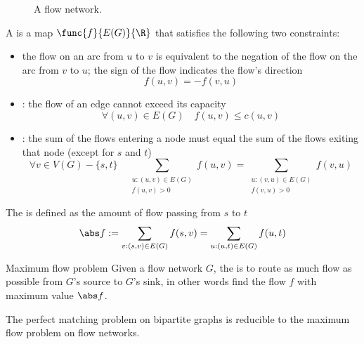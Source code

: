 \documentclass[a4paper, 12pt]{report}
\begin{document}
\begin{example}
\begin{figure}[H]
            \caption{A flow network.}
        \end{figure}
    \end{example}

    A  is a map $\func{f}{E(G)}{\R}$ that satisfies the following two constraints:

    \begin{itemize}
        \item {} the flow on an arc from $u$ to $v$ is equivalent to the negation of the flow on the arc from $v$ to $u$; the sign of the flow indicates the flow's direction $$f(u,v) = -f(v, u)$$
        \item {}: the flow of an edge cannot exceed its capacity $$\forall (u, v) \in E(G) \quad f(u, v) \le c(u, v)$$
        \item {}: the sum of the flows entering a node must equal the sum of the flows exiting that node (except for $s$ and $t$) $$\forall v \in V(G) - \{s, t\} \quad \sum_{\substack{u:(u, v) \in E(G) \\f(u, v) >0}}{f(u, v)} = \sum_{\substack{u:(v, u)\in E(G) \\ f(v, u) >0}}{f(v, u)}$$
    \end{itemize}

    The  is defined as the amount of flow passing from $s$ to $t$ $$\abs f := \sum_{v : (s, v) \in E(G)}{f(s, v)} = \sum_{u:(u, t)\in E(G)}{f(u, t)}$$

    \begin{frameddefn}{Maximum flow problem}
        Given a flow network $G$, the  is to route as much flow as possible from $G$'s source to $G$'s sink, in other words find the flow $f$ with maximum value $\abs f$.
    \end{frameddefn}

    \begin{framedthm}{}
        The perfect matching problem on bipartite graphs is reducible to the maximum flow problem on flow networks.
    \end{framedthm}
\end{document}
